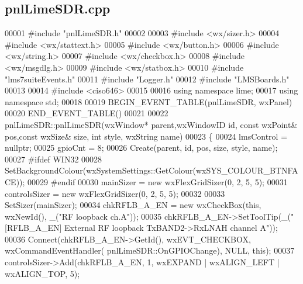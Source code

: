 \subsection{pnl\+Lime\+S\+D\+R.\+cpp}
\label{pnlLimeSDR_8cpp_source}

\begin{DoxyCode}
00001 \textcolor{preprocessor}{#include "pnlLimeSDR.h"}
00002 
00003 \textcolor{preprocessor}{#include <wx/sizer.h>}
00004 \textcolor{preprocessor}{#include <wx/stattext.h>}
00005 \textcolor{preprocessor}{#include <wx/button.h>}
00006 \textcolor{preprocessor}{#include <wx/string.h>}
00007 \textcolor{preprocessor}{#include <wx/checkbox.h>}
00008 \textcolor{preprocessor}{#include <wx/msgdlg.h>}
00009 \textcolor{preprocessor}{#include <wx/statbox.h>}
00010 \textcolor{preprocessor}{#include "lms7suiteEvents.h"}
00011 \textcolor{preprocessor}{#include "Logger.h"}
00012 \textcolor{preprocessor}{#include "LMSBoards.h"}
00013 
00014 \textcolor{preprocessor}{#include <ciso646>}
00015 
00016 \textcolor{keyword}{using namespace }lime;
00017 \textcolor{keyword}{using namespace }std;
00018 
00019 BEGIN\_EVENT\_TABLE(pnlLimeSDR, wxPanel)
00020 END\_EVENT\_TABLE()
00021 
00022 pnlLimeSDR::pnlLimeSDR(wxWindow* parent,wxWindowID \textcolor{keywordtype}{id}, const wxPoint& pos,const wxSize& 
      size, \textcolor{keywordtype}{int} style, wxString name)
00023 \{
00024     lmsControl = \textcolor{keyword}{nullptr};
00025     gpioCnt = 8;
00026     Create(parent, \textcolor{keywordtype}{id}, pos, size, style, name);
00027 \textcolor{preprocessor}{#ifdef WIN32}
00028     SetBackgroundColour(wxSystemSettings::GetColour(wxSYS\_COLOUR\_BTNFACE));
00029 \textcolor{preprocessor}{#endif}
00030     mainSizer = \textcolor{keyword}{new} wxFlexGridSizer(0, 2, 5, 5);
00031     controlsSizer = \textcolor{keyword}{new} wxFlexGridSizer(0, 2, 5, 5);
00032 
00033     SetSizer(mainSizer);
00034     chkRFLB\_A\_EN = \textcolor{keyword}{new} wxCheckBox(\textcolor{keyword}{this}, wxNewId(), \_(\textcolor{stringliteral}{"RF loopback ch.A"}));
00035     chkRFLB\_A\_EN->SetToolTip(\_(\textcolor{stringliteral}{"[RFLB\_A\_EN] External RF loopback TxBAND2->RxLNAH channel A"}));
00036     Connect(chkRFLB\_A\_EN->GetId(), wxEVT\_CHECKBOX, wxCommandEventHandler(
      pnlLimeSDR::OnGPIOChange), NULL, \textcolor{keyword}{this});
00037     controlsSizer->Add(chkRFLB\_A\_EN, 1, wxEXPAND | wxALIGN\_LEFT | wxALIGN\_TOP, 5);

\end{DoxyCode}

